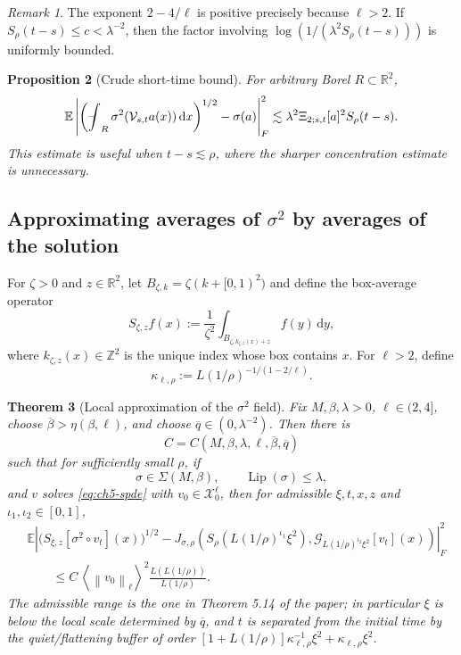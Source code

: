 \documentclass[11pt]{article}
\newtheorem{theorem}{Theorem}[section]
\newtheorem{proposition}[theorem]{Proposition}
\theoremstyle{definition}
\theoremstyle{remark}
\newtheorem{remark}[theorem]{Remark}
\newcommand{\R}{\mathbb{R}}
\newcommand{\E}{\mathbb{E}}
\newcommand{\Lip}{\operatorname{Lip}}
\newcommand{\dd}{\,\mathrm{d}}
\newcommand{\norm}[1]{\left\lVert #1\right\rVert}
\newcommand{\avgint}{\mathop{\rlap{\raisebox{.15ex}{--}}\!\int}\nolimits}
\newcommand{\hsemig}[2]{\mathcal{G}_{#1}\left[{#2}\right]}
\newcommand{\V}{\mathcal{V}}
\newcommand{\X}{\mathscr{X}}
\newcommand{\Srho}{S_{\rho}}
\begin{document}
\begin{remark}
The exponent \(2-4/\ell\) is positive precisely because \(\ell>2\). If \(\Srho(t-s)\le c<\lambda^{-2}\), then the factor involving
\(\log(1/(\lambda^2\Srho(t-s)))\) is uniformly bounded.
\end{remark}

\begin{proposition}[Crude short-time bound]\label{prop:ch5-concentration-crude}
For arbitrary Borel \(R\subset\R^2\),
\begin{equation}\label{eq:ch5-crude}
\E\left|
\left(\avgint_R\sigma^2(\V_{s,t}a(x))\dd x\right)^{1/2}
-\sigma(a)
\right|_F^2
\lesssim \lambda^2\Xi_{2;s,t}[a]^2\Srho(t-s).
\end{equation}
This estimate is useful when \(t-s\lesssim\rho\), where the sharper concentration estimate is unnecessary.
\end{proposition}

\subsection{Approximating averages of \texorpdfstring{$\sigma^2$}{sigma2} by averages of the solution}

For \(\zeta>0\) and \(z\in\R^2\), let \(B_{\zeta,k}=\zeta(k+[0,1)^2)\) and define the box-average operator
\begin{equation}\label{eq:ch5-Sbox}
S_{\zeta,z}f(x)
:=\frac1{\zeta^2}\int_{B_{\zeta,k_{\zeta,z}(x)+z}}f(y)\dd y,
\end{equation}
where \(k_{\zeta,z}(x)\in\mathbb Z^2\) is the unique index whose box contains \(x\).
For \(\ell>2\), define
\begin{equation}\label{eq:ch5-kappa}
\kappa_{\ell,\rho}
:=L(1/\rho)^{-1/(1-2/\ell)}.
\end{equation}

\begin{theorem}[Local approximation of the \texorpdfstring{$\sigma^2$}{sigma2} field]\label{thm:ch5-main-local}
Fix \(M,\beta,\lambda>0\), \(\ell\in(2,4]\), choose \(\overline\beta>\eta(\beta,\ell)\), and choose \(\overline q\in(0,\lambda^{-2})\). Then there is
\[
C=C(M,\beta,\lambda,\ell,\overline\beta,\overline q)
\]
such that for sufficiently small \(\rho\), if
\[
\sigma\in\Sigma(M,\beta),\qquad \Lip(\sigma)\le\lambda,
\]
and \(v\) solves \eqref{eq:ch5-spde} with \(v_0\in\X_0^\ell\), then for admissible \(\xi,t,x,z\) and \(\iota_1,\iota_2\in[0,1]\),
\begin{align}\label{eq:ch5-theorem514}
&\E\left|
\big(S_{\xi,z}[\sigma^2\circ v_t](x)\big)^{1/2}
-J_{\sigma,\rho}\!\left(
\Srho(L(1/\rho)^{\iota_1}\xi^2),
\hsemig{L(1/\rho)^{\iota_2}\xi^2}{v_t}(x)
\right)
\right|_F^2
\\
&\qquad\le
C\,\left\langle\norm{v_0}_\ell\right\rangle^2
\frac{L(L(1/\rho))}{L(1/\rho)}.
\end{align}
The admissible range is the one in Theorem 5.14 of the paper; in particular \(\xi\) is below the local scale determined by \(\overline q\), and \(t\) is separated from the initial time by the quiet/flattening buffer of order
\([1+L(1/\rho)]\kappa_{\ell,\rho}^{-1}\xi^2+\kappa_{\ell,\rho}\xi^2\).
\end{theorem}
\end{document}
